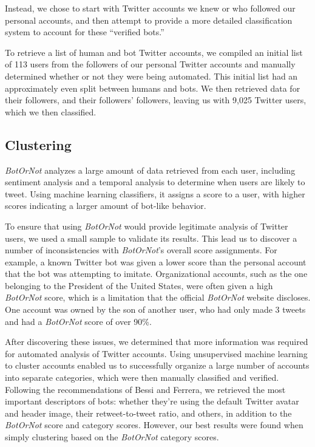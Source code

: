 \documentclass{sig-alternate-05-2015}
\begin{document}
Instead, we chose to start with Twitter accounts we knew or who followed our personal accounts, and then attempt to provide a more detailed classification system to account for these ``verified bots.''

To retrieve a list of human and bot Twitter accounts, we compiled an initial list of 113 users from the followers of our personal Twitter accounts and manually determined whether or not they were being automated. This initial list had an approximately even split between humans and bots. We then retrieved data for their followers, and their followers' followers, leaving us with 9,025 Twitter users, which we then classified.

\subsection{Clustering}

\emph{BotOrNot} analyzes a large amount of data retrieved from each user, including sentiment analysis and a temporal analysis to determine when users are likely to tweet. Using machine learning classifiers, it assigns a score to a user, with higher scores indicating a larger amount of bot-like behavior.

To ensure that using \emph{BotOrNot} would provide legitimate analysis of Twitter users, we used a small sample to validate its results. This lead us to discover a number of inconsistencies with \emph{BotOrNot}'s overall score assignments. For example, a known Twitter bot was given a lower score than the personal account that the bot was attempting to imitate. Organizational accounts, such as the one belonging to the President of the United States, were often given a high \emph{BotOrNot} score, which is a limitation that the official \emph{BotOrNot} website discloses. One account was owned by the son of another user, who had only made 3 tweets and had a \emph{BotOrNot} score of over 90\%.

After discovering these issues, we determined that more information was required for automated analysis of Twitter accounts. Using unsupervised machine learning to cluster accounts enabled us to successfully organize a large number of accounts into separate categories, which were then manually classified and verified. Following the recommendations of Bessi and Ferrera\cite{Bessi:PresElect}, we retrieved the most important descriptors of bots: whether they're using the default Twitter avatar and header image, their retweet-to-tweet ratio, and others, in addition to the \emph{BotOrNot} score and category scores. However, our best results were found when simply clustering based on the \emph{BotOrNot} category scores.
\end{document}
